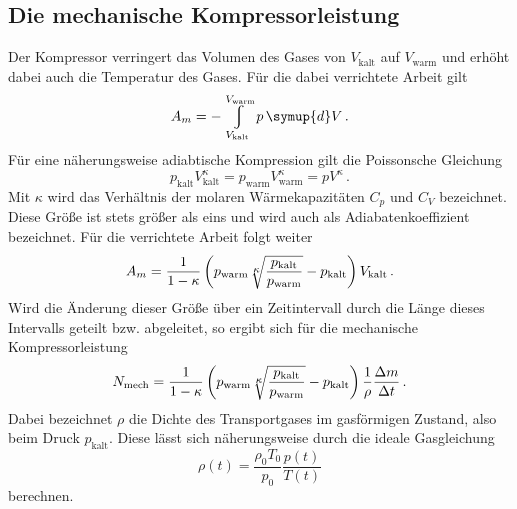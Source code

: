 \subsection{Die mechanische Kompressorleistung}
Der Kompressor verringert das Volumen des Gases von $V_\text{kalt}$ auf $V_\text{warm}$
und erhöht dabei auch die Temperatur des Gases. Für die dabei verrichtete Arbeit gilt
\begin{equation}
  A_m = - \displaystyle\varint\displaylimits_{V_\text{kalt}}^{V_\text{warm}} p \, \symup{d}V\,.
  \label{eqn:arbeitkompressor1}
\end{equation}
Für eine näherungsweise adiabtische Kompression gilt die Poissonsche Gleichung
\begin{equation}
  p_\text{kalt} V_\text{kalt}^{\kappa} = p_\text{warm} V_\text{warm}^{\kappa} = p V^{\kappa}\,.
  \label{eqn:poisson}
\end{equation}
Mit $\kappa$ wird das Verhältnis der molaren Wärmekapazitäten $C_p$ und $C_V$
bezeichnet. Diese Größe ist stets größer als eins und wird auch als Adiabatenkoeffizient bezeichnet.
Für die verrichtete Arbeit folgt weiter
\begin{equation}
  A_m = \frac{1}{1 - \kappa} \left(p_\text{warm} \sqrt[\leftroot{-1}\uproot{-1}\scriptstyle \kappa]{\frac{p_\text{kalt}}{p_\text{warm}}} - p_\text{kalt} \right) V_\text{kalt}\,.
  \label{eqn:arbeitkompressor2}
\end{equation}
Wird die Änderung dieser Größe über ein Zeitintervall durch die Länge dieses Intervalls
geteilt bzw. abgeleitet, so ergibt sich für die mechanische Kompressorleistung
\begin{equation}
  N_\text{mech} = \frac{1}{1 - \kappa} \left(p_\text{warm} \sqrt[\leftroot{-1}\uproot{-1}\scriptstyle \kappa]{\frac{p_\text{kalt}}{p_\text{warm}}} - p_\text{kalt} \right) \frac{1}{\rho} \frac{\Delta m}{\Delta t}\,.
  \label{eqn:kompressorleistung}
\end{equation}
Dabei bezeichnet $\rho$ die Dichte des Transportgases im gasförmigen Zustand, also beim
Druck $p_\text{kalt}$. Diese lässt sich näherungsweise durch die ideale Gasgleichung
\begin{equation}
  \rho(t) = \frac{\rho_0 T_0}{p_0} \dfrac{p(t)}{T(t)}
  \label{eqn:rho}
\end{equation}
berechnen.
